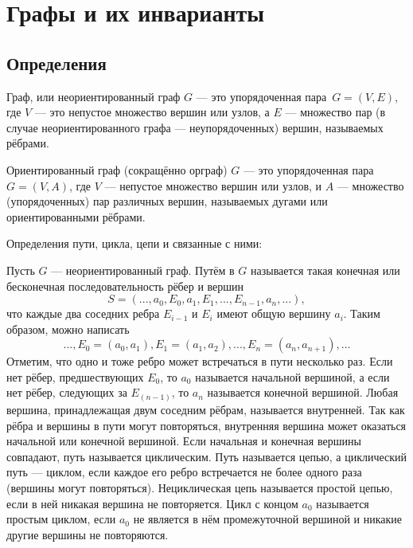 \chapter{Графы и их инварианты}

\section{Определения}

\begin{my_def}
Граф, или неориентированный граф $G$ --- это упорядоченная пара~$G=(V,E)$,
где $V$ --- это непустое множество вершин или узлов, а $E$ --- множество пар
(в случае неориентированного графа — неупорядоченных) вершин, называемых рёбрами.
\end{my_def}

\begin{my_def}
Ориентированный граф (сокращённо орграф)  $G$ --- это упорядоченная пара~$G=(V,A)$,
где  $V$ — непустое множество вершин или узлов, и  $A$ — множество (упорядоченных)
пар различных вершин, называемых дугами или ориентированными рёбрами.
\end{my_def}

Определения пути, цикла, цепи и связанные с ними:

\begin{my_def}
Пусть $G$ --- неориентированный граф. Путём в $G$ называется такая конечная или
бесконечная последовательность рёбер и вершин
$$S = (..., a_0,E_0, a_1, E_1, ..., E_{n-1}, a_n, ...),$$
что каждые два соседних ребра  $E_{i-1}$ и  $E_{i}$ имеют общую вершину  $a_{i}$.
Таким образом, можно написать
$$..., E_0=(a_0,a_1), E_1=(a_1,a_2), ... , E_n=(a_n,a_{n+1}), ...$$
Отметим, что одно и тоже ребро может встречаться в пути несколько раз. Если нет рёбер,
предшествующих  $E_{0}$, то  $a_{0}$ называется начальной вершиной, а если нет
рёбер, следующих за  $E_{(n-1)}$, то  $a_n$ называется конечной вершиной.
Любая вершина, принадлежащая двум соседним рёбрам, называется внутренней.
Так как рёбра и вершины в пути могут повторяться, внутренняя вершина может оказаться
начальной или конечной вершиной. Если начальная и конечная вершины совпадают,
путь называется циклическим. Путь называется цепью, а циклический путь — циклом,
если каждое его ребро встречается не более одного раза (вершины могут повторяться).
Нециклическая цепь называется простой цепью, если в ней никакая вершина не повторяется.
Цикл с концом  $a_{0}$ называется простым циклом, если  $a_{0}$ не является в нём
промежуточной вершиной и никакие другие вершины не повторяются.
\end{my_def}

